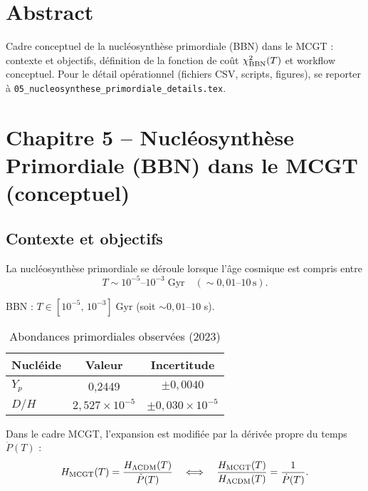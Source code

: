 \section*{Abstract}
Cadre conceptuel de la nucléosynthèse primordiale (BBN) dans le MCGT : contexte et objectifs, définition de la fonction de coût \(\chi^2_{\rm BBN}(T)\) et workflow conceptuel.  
Pour le détail opérationnel (fichiers CSV, scripts, figures), se reporter à \texttt{05\_nucleosynthese\_primordiale\_details.tex}.

\vspace{1em}
\section{Chapitre 5 – Nucléosynthèse Primordiale (BBN) dans le MCGT (conceptuel)}

\subsection{Contexte et objectifs}

La nucléosynthèse primordiale se déroule lorsque l’âge cosmique est compris entre
\[
  T \sim 10^{-5}\text{–}10^{-3}\;\mathrm{Gyr}
  \quad(\sim0{,}01\text{–}10\,\mathrm{s}).
\]

\begin{tcolorbox}[colback=gray!10,colframe=black,title=Fenêtre temporelle critique]
BBN : \(T\in[10^{-5},\,10^{-3}]\;\mathrm{Gyr}\) 
(soit \(\sim0{,}01\)–\(10\) s).
\end{tcolorbox}

\begin{table}[htbp]
  \centering
  \caption{Abondances primordiales observées (2023)}
  \begin{tabular}{lcc}
    \toprule
    Nucléide & Valeur & Incertitude \\
    \midrule
    \(Y_{p}\) & 0,2449 & \(\pm0,0040\) \\
    \(D/H\)   & \(2,527\times10^{-5}\) & \(\pm0,030\times10^{-5}\) \\
    \bottomrule
  \end{tabular}
\end{table}

Dans le cadre MCGT, l’expansion est modifiée par la dérivée propre du temps \(\dot P(T)\) :
\[
  H_{\rm MCGT}(T)
  = \frac{H_{\Lambda\mathrm{CDM}}(T)}{\dot P(T)}
  \quad\Longleftrightarrow\quad
  \frac{H_{\rm MCGT}(T)}{H_{\Lambda\mathrm{CDM}}(T)}
  = \frac{1}{\dot P(T)}.
\]

